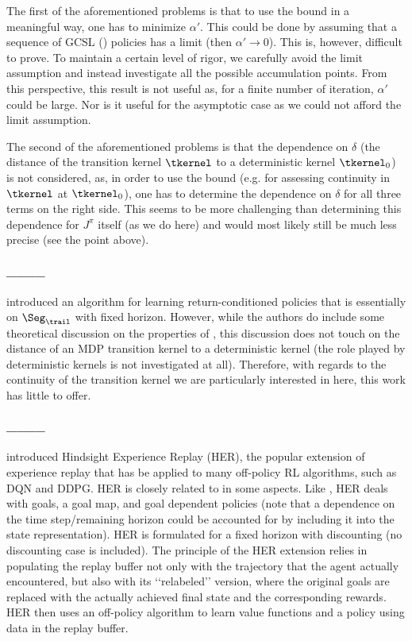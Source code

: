 The first of the aforementioned problems is that to use the bound in a meaningful way, one has to minimize $\alpha'$. This could be done by assuming that a sequence of GCSL (\eUDRL{}) policies has a limit (then $\alpha' \rightarrow 0$).
This is, however, difficult to prove.
To maintain a certain level of rigor, we carefully avoid the limit assumption and instead investigate all the possible accumulation points.
From this perspective, this result is not useful as, for a finite number of iteration, $\alpha'$ could be large.
Nor is it useful for the asymptotic case as we could
not afford the limit assumption.

The second of the aforementioned problems is that the dependence on $\delta$ (the distance of the transition kernel $\tkernel$ to a deterministic kernel
$\tkernel_0$)
is not considered, as, in order to use the bound
(e.g. for assessing continuity in $\tkernel$ at $\tkernel_0$),
one has to determine the dependence on $\delta$
for all three terms on the right side.
This seems to be more challenging than determining this 
dependence for $J^{\pi}$ itself (as we do
here) and would most likely still be much less precise (see the point above).

\paragraph{____} introduced an algorithm for learning return-conditioned policies that is essentially \eUDRL{} on $\Seg_{\trail}$ with fixed horizon.
However, while the authors do include some theoretical discussion on the properties of \eUDRL{}, this discussion does not touch on the distance of an MDP transition kernel to a deterministic kernel (the role played by deterministic kernels is not investigated at all). 
Therefore, with regards to the continuity of the transition kernel we are particularly interested in here, this work has little to offer.

\paragraph{____} introduced Hindsight Experience Replay (HER), the popular extension of experience replay that has be applied to many off-policy RL algorithms, such as DQN and DDPG.
HER is closely related to \eUDRL{} in some aspects.
Like \eUDRL{}, HER deals with goals, a goal map, and goal dependent policies (note that a dependence on the time step/remaining horizon could be accounted for by including it into the state representation).
HER is formulated for a fixed horizon with discounting (no discounting case is included).
The principle of the HER extension relies in populating the replay buffer not only with the trajectory that the agent actually encountered, but also with its \lq\lq{}relabeled\rq\rq{} version, where the original goals are replaced with the actually achieved final state and the corresponding rewards.
HER then uses an off-policy algorithm to learn value functions and a policy using data in the replay buffer.

